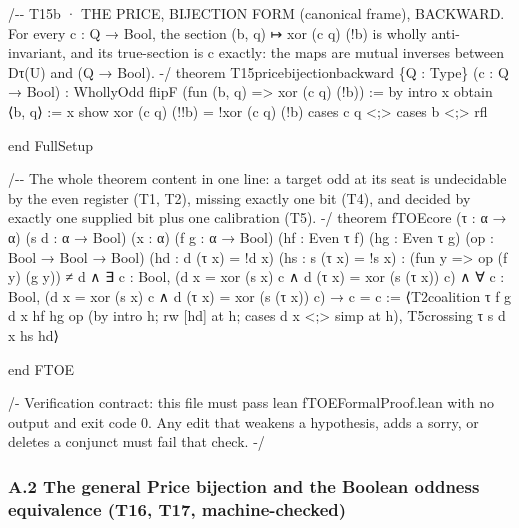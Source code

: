 \documentclass[10pt]{article}
\renewcommand{\_}{\origunderscore\allowbreak}
\newenvironment{Shaded}{}{}
\newcommand{\NormalTok}[1]{#1}
\begin{document}
\begin{Shaded}
\begin{Highlighting}[]
\NormalTok{/{-}{-} T15b · THE PRICE, BIJECTION FORM (canonical frame), BACKWARD.}
\NormalTok{    For every c : Q → Bool, the section (b, q) ↦ xor (c q) (!b) is wholly}
\NormalTok{    anti{-}invariant, and its true{-}section is c exactly: the maps are mutual}
\NormalTok{    inverses between Dτ(U) and (Q → Bool). {-}/}
\NormalTok{theorem T15\_price\_bijection\_backward \{Q : Type\} (c : Q → Bool) :}
\NormalTok{    WhollyOdd flipF (fun (b, q) =\textgreater{} xor (c q) (!b)) := by}
\NormalTok{  intro x}
\NormalTok{  obtain ⟨b, q⟩ := x}
\NormalTok{  show xor (c q) (!!b) = !xor (c q) (!b)}
\NormalTok{  cases c q \textless{};\textgreater{} cases b \textless{};\textgreater{} rfl}

\NormalTok{end FullSetup}

\NormalTok{/{-}{-} The whole theorem content in one line:}
\NormalTok{    a target odd at its seat is undecidable by the even register (T1, T2),}
\NormalTok{    missing exactly one bit (T4), and decided by exactly one supplied bit}
\NormalTok{    plus one calibration (T5). {-}/}
\NormalTok{theorem fTOE\_core (τ : α → α) (s d : α → Bool) (x : α)}
\NormalTok{    (f g : α → Bool) (hf : Even τ f) (hg : Even τ g) (op : Bool → Bool → Bool)}
\NormalTok{    (hd : d (τ x) = !d x) (hs : s (τ x) = !s x) :}
\NormalTok{    (fun y =\textgreater{} op (f y) (g y)) ≠ d ∧}
\NormalTok{    ∃ c : Bool, (d x = xor (s x) c ∧ d (τ x) = xor (s (τ x)) c) ∧}
\NormalTok{      ∀ c\textquotesingle{} : Bool, (d x = xor (s x) c\textquotesingle{} ∧ d (τ x) = xor (s (τ x)) c\textquotesingle{}) → c\textquotesingle{} = c :=}
\NormalTok{  ⟨T2\_coalition τ f g d x hf hg op (by intro h; rw [hd] at h; cases d x \textless{};\textgreater{} simp at h),}
\NormalTok{   T5\_crossing τ s d x hs hd⟩}

\NormalTok{end FTOE}

\NormalTok{/{-} Verification contract: this file must pass \textasciigrave{}lean fTOE\_Formal\_Proof.lean\textasciigrave{}}
\NormalTok{   with no output and exit code 0. Any edit that weakens a hypothesis,}
\NormalTok{   adds a sorry, or deletes a conjunct must fail that check. {-}/}
\end{Highlighting}
\end{Shaded}

\hypertarget{a.2-the-general-price-bijection-and-the-boolean-oddness-equivalence-t16-t17-machine-checked}{%
\subsubsection{A.2 The general Price bijection and the Boolean oddness
equivalence (T16, T17,
machine-checked)}\label{a.2-the-general-price-bijection-and-the-boolean-oddness-equivalence-t16-t17-machine-checked}}
\end{document}
